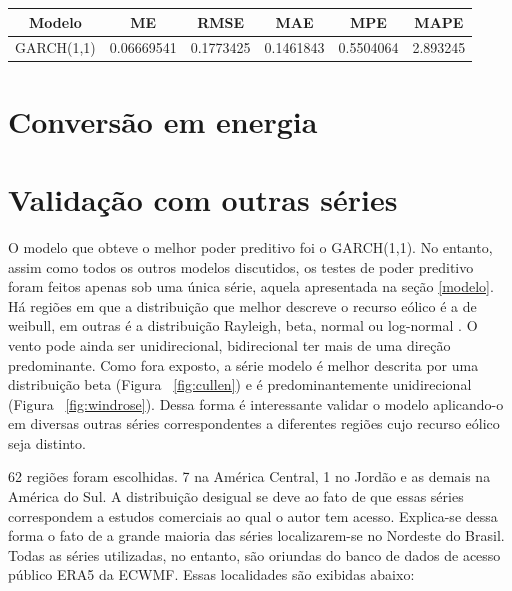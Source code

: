 \documentclass[
	12pt,				%
	openright,			%
	oneside,			%
	a4paper,			%
	english,			%
	french,				%
	spanish,			%
	brazil				%
	]{abntex2}
\begin{document}
\begin{center}
\begin{tabular}{ |c|c|c|c|c|c| } 
\hline
Modelo&ME&RMSE&MAE&MPE&MAPE \\
\hline
GARCH(1,1)&0.06669541&0.1773425&0.1461843&0.5504064&2.893245\\
\hline
\end{tabular}
\end{center}

\chapter{Conversão em energia}

\chapter{Validação com outras séries}

O modelo que obteve o melhor poder preditivo foi o GARCH(1,1). No entanto, assim como todos os outros modelos discutidos, os testes  de poder preditivo foram feitos apenas sob uma única série, aquela apresentada na seção \ref{modelo}. Há regiões em que a distribuição que melhor descreve o recurso eólico é  a de weibull, em outras é a distribuição Rayleigh, beta, normal ou log-normal \cite{dists}. O vento pode ainda ser unidirecional, bidirecional ter mais de uma direção predominante. Como fora exposto, a série modelo é melhor descrita por uma distribuição beta (Figura ~\ref{fig:cullen}) e é predominantemente unidirecional (Figura ~\ref{fig:windrose}). Dessa forma é interessante validar o modelo aplicando-o em diversas outras séries correspondentes a diferentes regiões cujo recurso eólico seja distinto. 

62 regiões foram escolhidas. 7 na América Central, 1 no Jordão e as demais na América do Sul. A distribuição desigual se deve ao fato de que essas séries correspondem a estudos comerciais ao qual o autor tem acesso. Explica-se dessa forma o fato de a grande maioria das séries localizarem-se no Nordeste do Brasil. Todas as séries utilizadas, no entanto, são oriundas do banco de dados de acesso público ERA5 da ECWMF. Essas localidades são exibidas abaixo:
\end{document}

